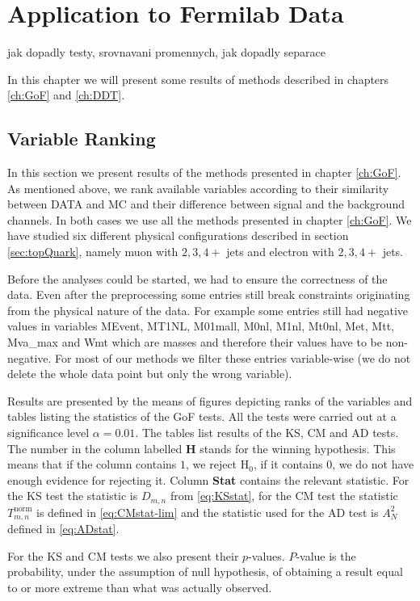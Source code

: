 \chapter{Application to Fermilab Data}
jak dopadly testy, srovnavani promennych, jak dopadly separace

\noindent In this chapter we will present some results of methods described in chapters \ref{ch:GoF} and \ref{ch:DDT}. 

\section{Variable Ranking}
In this section we present results  of the methods presented in chapter \ref{ch:GoF}. As mentioned above, we rank available variables according to their similarity between DATA and MC and their difference between signal and the background channels. In both cases we use all the methods presented in chapter \ref{ch:GoF}. We have studied six different physical configurations described in section \ref{sec:topQuark}, namely muon with $2, 3, 4+$ jets and electron with $2, 3, 4+$ jets.

Before the analyses could be started, we had to ensure the correctness of the data. Even after the preprocessing some entries still break constraints originating from the physical nature of the data. For example some entries still had negative values in variables \textsf{MEvent, MT1NL, M01mall, M0nl, M1nl, Mt0nl, Met, Mtt, Mva\_max} and \textsf{Wmt} which are masses and therefore their values have to be non-negative. For most of our methods we filter these entries variable-wise (we do not delete the whole data point but only the wrong variable). 

Results are presented by the means of figures depicting ranks of the variables and tables listing the statistics of the GoF tests. All the tests were carried out at a significance level $\alpha = 0.01.$ The tables list results of the KS, CM and AD tests. The number in the column labelled \textbf{H} stands for the winning hypothesis. This means that if the column contains $1$, we reject $\mathrm{H}_0$, if it contains $0$, we do not have enough evidence for rejecting it. Column \textbf{Stat} contains the relevant statistic. For the KS test the statistic is $D_{m,n}$ from \eqref{eq:KSstat}, for the CM test the statistic $T^{\mathrm{norm}}_{m,n}$ is defined in \eqref{eq:CMstat-lim} and the statistic used for the AD test is $A_N^2$ defined in \eqref{eq:ADstat}. 

For the KS and CM tests we also present their $p$-values. $P$-value is the probability, under the assumption of null hypothesis, of obtaining a result equal to or more extreme than what was actually observed. 

